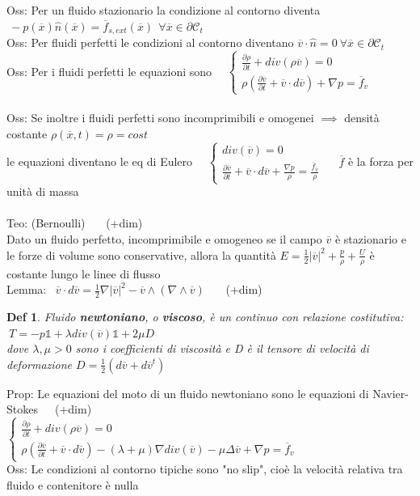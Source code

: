 \documentclass{article}
\theoremstyle{unnumbered}
\newtheorem* {theoremT}{Def}
\theoremstyle{unnumbered1}
\newenvironment{defi}{\begin{gBox}\begin{theoremT}}{\end{theoremT}\end{gBox}}
\begin{document}
%
%
Oss: Per un fluido stazionario la condizione al contorno diventa $\ -p(\overline{x})\hat{n}(\overline{x})=\overline{f}_{s,ext}(\overline{x}) \ \ \forall \overline{x}\in \partial \mathcal{C}_t$\\
%
%
Oss: Per fluidi perfetti le condizioni al contorno diventano
$\overline{v}\cdot\hat{n}=0 \ \forall \overline{x}\in\partial \mathcal{C}_t$\\
%
%
%
Oss: Per i fluidi perfetti le equazioni sono \ \ $\begin{cases}
\frac{\partial \rho}{\partial t} + div(\rho\overline{v})=0 \\
\rho(\frac{\partial\overline{v}}{\partial t} +\overline{v}\cdot d\overline{v}) +\nabla p=\overline{f}_v  \end{cases}$\\ \\
%
Oss: Se inoltre i fluidi perfetti sono incomprimibili e omogenei $\implies$ densità costante $\rho(\overline{x},t)=\rho=cost$\\
\phantom{Oss: }le equazioni diventano le eq di Eulero \ \ $\begin{cases}div(\overline{v})=0 \\ \frac{\partial\overline{v}}{\partial t} +\overline{v}\cdot d\overline{v} +\frac{\nabla p}{\rho}=\frac{\overline{f}_v}{\rho} \end{cases}$ \ \ $\overline{f}$ è la forza per unità di massa\\ \\
%
%
%
Teo: (Bernoulli) \ \ \ (+dim)\\
Dato un fluido perfetto, incomprimibile e omogeneo se il campo $\overline{v}$ è stazionario e le forze di volume sono conservative, allora la quantità $E=\frac{1}{2}|\overline{v}|^2+\frac{p}{\rho}+\frac{U}{\rho}$ è costante lungo le linee di flusso \\
%
Lemma: \ $\overline{v}\cdot d\overline{v}=\frac{1}{2}\nabla|\overline{v}|^2 -\overline{v}\wedge(\nabla\wedge\overline{v})$ \ \ \ (+dim)\\
%
%
%
\begin{defi}
Fluido \textbf{newtoniano}, o \textbf{viscoso}, è un continuo con relazione costitutiva: $\ T=-p\mathds{1} + \lambda div(\overline{v})\mathds{1}+2\mu D$\\
dove $\lambda, \mu >0$ sono i coefficienti di viscosità e D è il tensore di velocità di deformazione $D=\frac{1}{2}(d\overline{v}+d\overline{v}^t)$
\end{defi}
%
Prop: Le equazioni del moto di un fluido newtoniano sono le equazioni di Navier-Stokes\ \ \ (+dim)\\
\phantom{Prop: }$\begin{cases}
\frac{\partial\rho}{\partial t} + div(\rho\overline{v})=0\\
\rho(\frac{\partial\overline{v}}{\partial t}+\overline{v}\cdot d\overline{v}) -(\lambda+\mu)\nabla div(\overline{v}) -\mu\Delta\overline{v} +\nabla p = \overline{f}_v
\end{cases}$ \\
%
Oss: Le condizioni al contorno tipiche sono "no slip", cioè la velocità relativa tra fluido e contenitore è nulla\\
\end{document}
